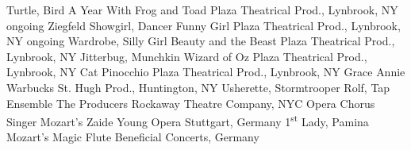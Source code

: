 \begin{cventries}
  \cventrytabb %
    {Turtle, Bird}%
    {A Year With Frog and Toad}%
    {Plaza Theatrical Prod., Lynbrook, NY}%
    {ongoing} %
  \cventrytabb %
    {Ziegfeld Showgirl, Dancer}%
    {Funny Girl}%
    {Plaza Theatrical Prod., Lynbrook, NY}%
    {ongoing} %
  \cventrytab %
    {Wardrobe, Silly Girl}%
    {Beauty and the Beast}%
    {Plaza Theatrical Prod., Lynbrook, NY}%
    {} %
  \cventrytab %
    {Jitterbug, Munchkin}%
    {Wizard of Oz}%
    {Plaza Theatrical Prod., Lynbrook, NY}%
    {} %
  \cventrytab %
    {Cat}%
    {Pinocchio}%
    {Plaza Theatrical Prod., Lynbrook, NY}%
    {} %
  \cventrytab %
    {Grace}%
    {Annie Warbucks}%
    {St. Hugh Prod., Huntington, NY}%
    {} %
  \cventrytab 
    {Usherette, Stormtrooper Rolf, Tap Ensemble}%
    {The Producers}%
    {Rockaway Theatre Company, NYC}%
    {} %
  \cventrytab
    {Opera Chorus Singer}%
    {Mozart's Zaide}%
    {Young Opera Stuttgart, Germany}%
    {}
  \cventrytab
    {1\textsuperscript{st} Lady, Pamina}
    {Mozart's Magic Flute}
    {Beneficial Concerts, Germany}
    {}
\end{cventries}